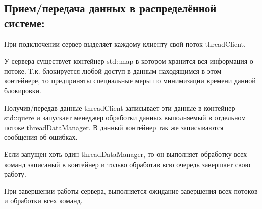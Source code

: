 \subsection*{Прием/передача данных в распределённой системе\+:}


\begin{DoxyItemize}
\item При подключении сервер выделяет каждому клиенту свой поток thread\+Client.
\item У сервера существует контейнер std\+::map в котором хранится вся информация о потоке. Т.\+к. блокируется любой доступ в данным находящимся в этом контейнере, то предприняты специальные меры по минимизации времени данной блокировки.
\item Получив/передав данные thread\+Client записывает эти данные в контейнер std\+::quere и запускает менеджер обработки данных выполняемый в отдельном потоке thread\+Data\+Manager. В данный контейнер так же записываются сообщения об ошибках.
\item Если запущен хоть один thread\+Data\+Manager, то он выполняет обработку всех команд записаный в контейнер и только обработав всю очередь завершает свою работу.
\item При завершении работы сервера, выполняется ожидание завершения всех потоков и обработки всех команд. 
\end{DoxyItemize}